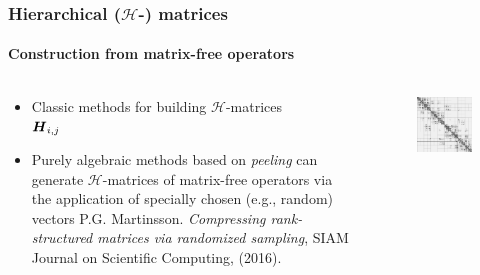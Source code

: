 \documentclass[10pt,final,xcolor=dvipsnames,aspect ratio=169]{beamer}
\begin{document}
\begin{frame}[t]
	\frametitle{Hierarchical ($\mathcal{H}$-) matrices}
	\framesubtitle{Construction from matrix-free operators}
	\begin{columns}
	\begin{column}{0.59\columnwidth}
	\begin{itemize}
		\setlength\itemsep{1.0em}
		\item<1-> Classic methods for building $\mathcal{H}$-matrices \\  $\boldsymbol{H}_{i,j}$
		\item<2-> Purely algebraic methods based on \textit{peeling} can generate $\mathcal{H}$-matrices of matrix-free operators via the application of specially chosen (e.g., random) vectors
		{\scriptsize{P.G. Martinsson.
			{\em Compressing rank-structured matrices via randomized sampling},
			SIAM Journal on Scientific Computing, (2016).}
		}
	\end{itemize}
\end{column}
\begin{column}{0.4\columnwidth}
\begin{figure} 
\begin{center} 
\includegraphics[scale=0.16]{Hmatrix_Structure.png}

\end{center}
\end{figure}
\end{column}
\end{columns}
\end{frame}
\end{document}
